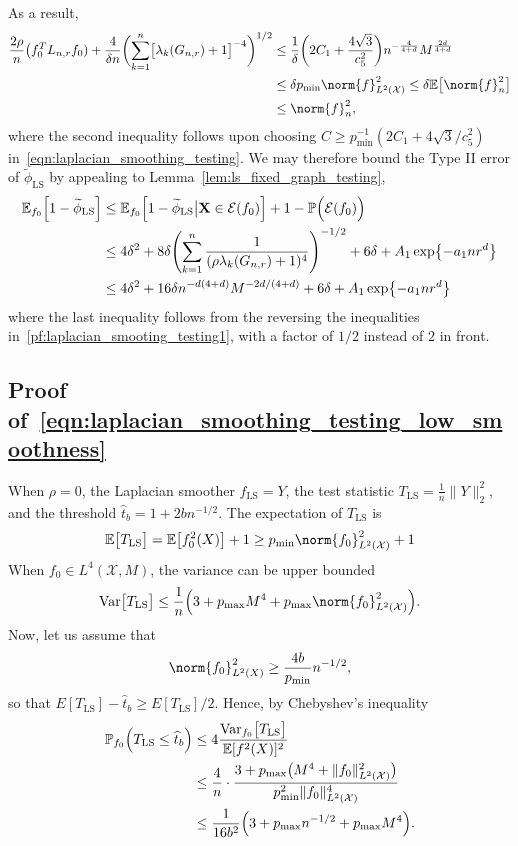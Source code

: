 \documentclass[twoside]{article}
\newcommand{\Var}{\mathrm{Var}}
\newcommand{\1}{\mathbf{1}}
\newcommand{\Lap}{L}
\newcommand{\Xset}{\mathcal{X}}
\newcommand{\Leb}{L}
\newcommand{\mc}[1]{\mathcal{#1}}
\newcommand{\Pbb}{\mathbb{P}}
\newcommand{\Ebb}{\mathbb{E}}
\newcommand{\wt}[1]{\widetilde{#1}}
\newcommand{\wh}[1]{\widehat{#1}}
\newcommand{\LS}{\mathrm{LS}}
\theoremstyle{definition}
\theoremstyle{remark}
\begin{document}
As a result, 
\begin{align*}
\frac{2\rho}{n} \bigl(f_0^T \Lap_{n,r} f_0) + \frac{4}{\delta n}\biggl(\sum_{k = 1}^{n} \bigl[\lambda_k(G_{n,r}) + 1\bigr]^{-4}\biggr)^{1/2} & \leq \frac{1}{\delta}\biggl(2C_1 + \frac{4\sqrt{3}}{c_5^2}\biggr)n^{-\frac{4}{4 + d}} M^{\frac{2d}{4 + d}} \\
& \leq \delta p_{\min} \norm{f}_{\Leb^2(\Xset)}^2 \leq \delta \Ebb\bigl[\norm{f}_n^2\bigr] \\
& \leq \norm{f}_n^2,
\end{align*}
where the second inequality follows upon choosing $C \geq p_{\min}^{-1}(2C_1 + 4\sqrt{3}/c_5^2)$ in~\eqref{eqn:laplacian_smoothing_testing}. We may therefore bound the Type II error of $\wt{\phi}_{\LS}$ by appealing to Lemma~\ref{lem:ls_fixed_graph_testing},
\begin{align*}
\Ebb_{f_0}\Bigl[1 - \wt{\phi}_{\LS}\Bigr] & \leq \Ebb_{f_0}\Bigl[1 - \wt{\phi}_{\LS}\big| \mathbf{X} \in \mc{E}(f_0)\Bigr] + 1 - \Pbb\Bigl(\mc{E}(f_0)\Bigr) \\
& \leq 4 \delta^2 + 8 \delta \Biggl(\sum_{k = 1}^{n} \frac{1}{(\rho\lambda_k(G_{n,r}) + 1)^4} \Biggr)^{-1/2} + 6\delta + A_1\exp\bigl\{-a_1nr^{d}\bigr\} \\
& \leq 4 \delta^2 + 16\delta n^{-d(4 + d)}M^{-2d/(4 + d)}  + 6\delta + A_1\exp\bigl\{-a_1nr^{d}\bigr\}
\end{align*}
where the last inequality follows from the reversing the inequalities in~\eqref{pf:laplacian_smooting_testing1}, with a factor of $1/2$ instead of $2$ in front. 

\subsection{Proof of~\eqref{eqn:laplacian_smoothing_testing_low_smoothness}}
When $\rho = 0$, the Laplacian smoother $\wh{f}_{\LS} = Y$, the test statistic $T_{\LS} = \frac{1}{n}\|Y\|_2^2$, and the threshold $\wh{t}_b = 1 + 2bn^{-1/2}$. The expectation of $T_{\LS}$ is 
\begin{equation*}
\Ebb\bigl[T_{\LS}\bigr] = \mathbb{E}\bigl[f_0^2(X)\bigr] + 1 \geq p_{\min} \norm{f_0}_{\Leb^2(\Xset)}^2 + 1
\end{equation*}
When $f_0 \in \Leb^4(\Xset,M)$, the variance can be upper bounded
\begin{equation*}
\Var\bigl[T_{\LS}\bigr] \leq \frac{1}{n}\Bigl(3 + p_{\max} M^4 + p_{\max}\norm{f_0}_{\Leb^2(\Xset)}^2\Bigr).
\end{equation*}
Now, let us assume that
\begin{equation*}
\norm{f_0}_{\Leb^2(X)}^2 \geq \frac{4b}{p_{\min}} n^{-1/2},
\end{equation*}
so that $E[T_{\LS}] - \wh{t}_b \geq E[T_{\LS}]/2$. Hence, by Chebyshev's inequality
\begin{align*}
\mathbb{P}_{f_0}\Bigl(T_{\LS} \leq \wh{t}_b \Bigr) & \leq 4 \frac{\Var_{f_0}\bigl[T_{\LS}\bigr]}{\mathbb{E}[f^2(X)]^2} \\
& \leq \frac{4}{n} \cdot \frac{ 3 + p_{\max}\bigl(M^4 + \|f_0\|_{\Leb^2(\Xset)}^2 \bigr)}{p_{\min}^2 \|f_0\|_{\Leb^2(\Xset)}^4} \\
& \leq \frac{1}{16b^2}\Bigl(3 + p_{\max}n^{-1/2} + p_{\max}M^4\Bigr).
\end{align*}
\end{document}
